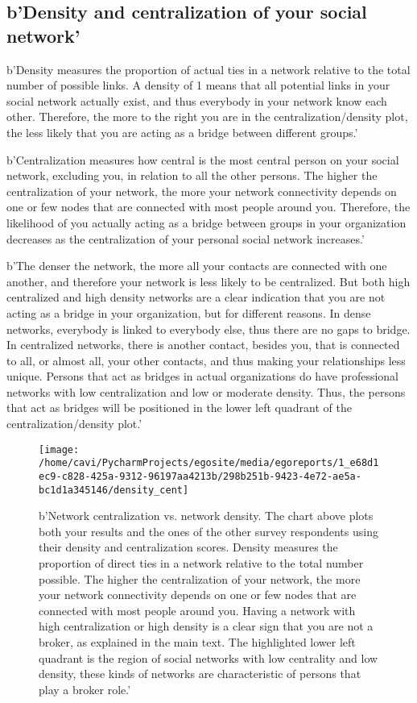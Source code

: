 \documentclass[a4paper,12pt]{article}
\begin{document}
\subsection*{b'Density and centralization of your social network'}


b'Density measures the proportion of actual ties in a network relative to the total number of possible links. A density of 1 means that all potential links in your social network actually exist, and thus everybody in your network know each other. Therefore, the more to the right you are in the centralization/density plot, the less likely that you are acting as a bridge between different groups.'

b'Centralization measures how central is the most central person on your social network, excluding you, in relation to all the other persons. The higher the centralization of your network, the more your network connectivity depends on one or few nodes that are connected with most people around you. Therefore, the likelihood of you actually acting as a bridge between groups in your organization decreases as the centralization of your personal social network increases.'

b'The denser the network, the more all your contacts are connected with one another, and therefore your network is less likely to be centralized. But both high centralized and high density networks are a clear indication that you are not acting as a bridge in your organization, but for different reasons. In dense networks, everybody is linked to everybody else, thus there are no gaps to bridge. In centralized networks, there is another contact, besides you, that is connected to all, or almost all, your other contacts, and thus making your relationships less unique. Persons that act as bridges in actual organizations do have professional networks with low centralization and low or moderate density. Thus, the persons that act as bridges will be positioned in the lower left quadrant of the centralization/density plot.'


\begin{figure}[H]
\centering
\texttt{[image: /home/cavi/PycharmProjects/egosite/media/egoreports/1\_e68d1ec9-c828-425a-9312-96197aa4213b/298b251b-9423-4e72-ae5a-bc1d1a345146/density\_cent]}
\caption{b'Network centralization vs. network density. The chart above plots both your results and the ones of the other survey respondents using their density and centralization scores. Density measures the proportion of direct ties in a network relative to the total number possible. The higher the centralization of your network, the more your network connectivity depends on one or few nodes that are connected with most people around you. Having a network with high centralization or high density is a clear sign that you are not a broker, as explained in the main text. The highlighted lower left quadrant is the region of social networks with low centrality and low density, these kinds of networks are characteristic of persons that play a broker role.'}
\end{figure}
\end{document}
